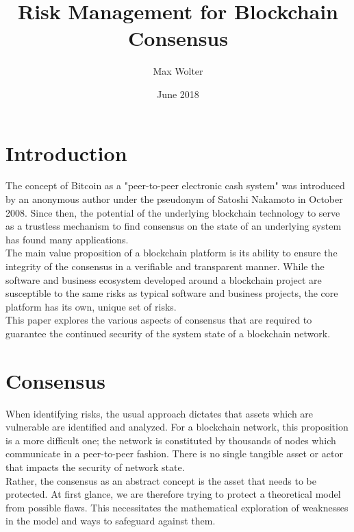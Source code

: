 \documentclass[11pt,a4paper,draft]{article}
\title{Risk Management for Blockchain Consensus}
\author{Max Wolter}
\date{June 2018}
\begin{document}
\maketitle

\begin{abstract}

\end{abstract}

\section{Introduction}

The concept of Bitcoin as a "peer-to-peer electronic cash system" was introduced
by an anonymous author under the pseudonym of Satoshi Nakamoto in October 2008.
Since then, the potential of the underlying blockchain technology to serve as
a trustless mechanism to find consensus on the state of an underlying system has
found many applications.\\

The main value proposition of a blockchain platform is its ability to ensure
the integrity of the consensus in a verifiable and transparent manner. While the
software and business ecosystem developed around a blockchain project are
susceptible to the same risks as typical software and business projects, the
core platform has its own, unique set of risks.\\

This paper explores the various aspects of consensus that are required to
guarantee the continued security of the system state of a blockchain network.\\

\section{Consensus}

When identifying risks, the usual approach dictates that assets which are
vulnerable are identified and analyzed. For a blockchain network, this
proposition is a more difficult one; the network is constituted by thousands of
nodes which communicate in a peer-to-peer fashion. There is no single tangible
asset or actor that impacts the security of network state.\\

Rather, the consensus as an abstract concept is the asset that needs to be
protected. At first glance, we are therefore trying to protect a theoretical
model from possible flaws. This necessitates the mathematical exploration of
weaknesses in the model and ways to safeguard against them.\\
\end{document}
